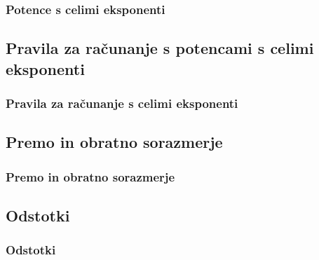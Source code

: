         \begin{frame}
            \frametitle{Potence s celimi eksponenti}
        \end{frame}

    \subsection{Pravila za računanje s potencami s celimi eksponenti}

        \begin{frame}
            \frametitle{Pravila za računanje s celimi eksponenti}
        \end{frame}

    \subsection{Premo in obratno sorazmerje}

        \begin{frame}
            \frametitle{Premo in obratno sorazmerje}
        \end{frame}

    \subsection{Odstotki}

        \begin{frame}
            \frametitle{Odstotki}
        \end{frame}

